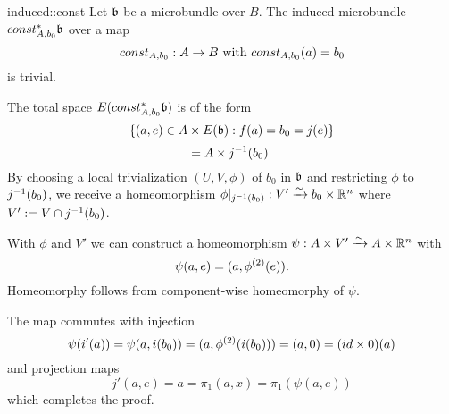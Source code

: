 \begin{mylemma}{induced::const}{}
    Let $\mathfrak{b}$ be a microbundle over $B$. The induced microbundle $const_{A, b_0}^*\mathfrak{b}$ over a map
    \[ const_{A, b_0}: A \to B \text{ with } const_{A, b_0}(a) = b_0 \]
    is trivial.
\end{mylemma}

\begin{myproof}
    The total space $E(const_{A, b_0}^*\mathfrak{b})$ is of the form
    \[ \{(a, e) \in A \times E(\mathfrak{b}):f(a) = b_0 = j(e)\} \]
    \[ = A \times j^{-1}(b_0). \]
    By choosing a local trivialization $(U, V, \phi)$ of $b_0$ in $\mathfrak{b}$ and restricting $\phi$ to $j^{-1}(b_0)$,
    we receive a homeomorphism $\phi\vert_{j^{-1}(b_0)}: V' \xrightarrow{\sim} b_0 \times \mathbb{R}^n$ where $V' := V \cap j^{-1}(b_0)$.
    
    With $\phi$ and $V'$ we can construct a homeomorphism $\psi: A \times V' \xrightarrow{\sim} A \times \mathbb{R}^n$ with
    \[ \psi(a, e) = (a, \phi^{(2)}(e)). \]
    Homeomorphy follows from component-wise homeomorphy of $\psi$.

    The map commutes with injection
    \[ \psi(i'(a)) = \psi(a, i(b_0)) = (a, \phi^{(2)}(i(b_0))) = (a, 0) = (id \times 0)(a) \]
    and projection maps
    \[ j'(a, e) = a = \pi_1(a, x) = \pi_1(\psi(a, e)) \]
    which completes the proof.
\end{myproof}